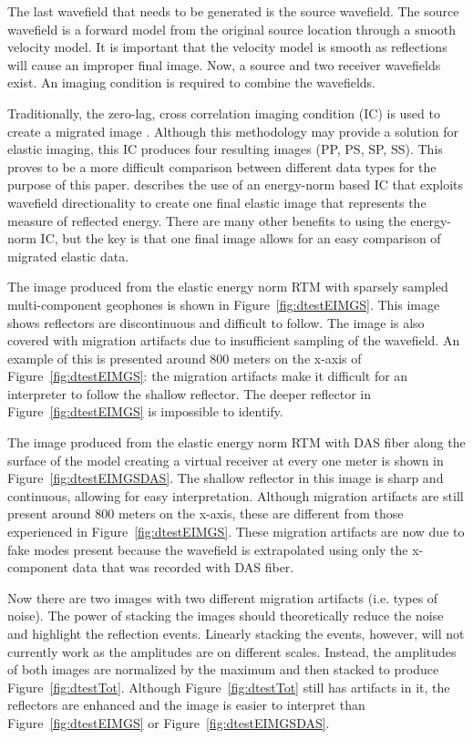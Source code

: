 The last wavefield that needs to be generated is the source wavefield. The source wavefield is a forward model from the original source location through a smooth velocity model. It is important that the velocity model is smooth as reflections will cause an improper final image. Now, a source and two receiver wavefields exist. An imaging condition is required to combine the wavefields.

Traditionally, the zero-lag, cross correlation imaging condition (IC) is used to create a migrated image \citep{claerbout1985imaging}. Although this methodology may provide a solution for elastic imaging, this IC produces four resulting images (PP, PS, SP, SS). This proves to be a more difficult comparison between different data types for the purpose of this paper. \citet{rocha2016isotropic} describes the use of an energy-norm based IC that exploits wavefield directionality to create one final elastic image that represents the measure of reflected energy. There are many other benefits to using the energy-norm IC, but the key is that one final image allows for an easy comparison of migrated elastic data.

The image produced from the elastic energy norm RTM with sparsely sampled multi-component geophones is shown in Figure~\ref{fig:dtestEIMGS}. This image shows reflectors are discontinuous and difficult to follow. The image is also covered with migration artifacts due to insufficient sampling of the wavefield. An example of this is presented around 800 meters on the x-axis of Figure~\ref{fig:dtestEIMGS}: the migration artifacts make it difficult for an interpreter to follow the shallow reflector. The deeper reflector in Figure~\ref{fig:dtestEIMGS} is impossible to identify.

The image produced from the elastic energy norm RTM with DAS fiber along the surface of the model creating a virtual receiver at every one meter is shown in Figure~\ref{fig:dtestEIMGSDAS}. The shallow reflector in this image is sharp and continuous, allowing for easy interpretation. Although migration artifacts are still present around 800 meters on the x-axis, these are different from those experienced in Figure~\ref{fig:dtestEIMGS}. These migration artifacts are now due to fake modes present because the wavefield is extrapolated using only the x-component data that was recorded with DAS fiber.

Now there are two images with two different migration artifacts (i.e. types of noise). The power of stacking the images should theoretically reduce the noise and highlight the reflection events. Linearly stacking the events, however, will not currently work as the amplitudes are on different scales. Instead, the amplitudes of both images are normalized by the maximum and then stacked to produce Figure~\ref{fig:dtestTot}. Although Figure~\ref{fig:dtestTot} still has artifacts in it, the reflectors are enhanced and the image is easier to interpret than Figure~\ref{fig:dtestEIMGS} or Figure~\ref{fig:dtestEIMGSDAS}.


